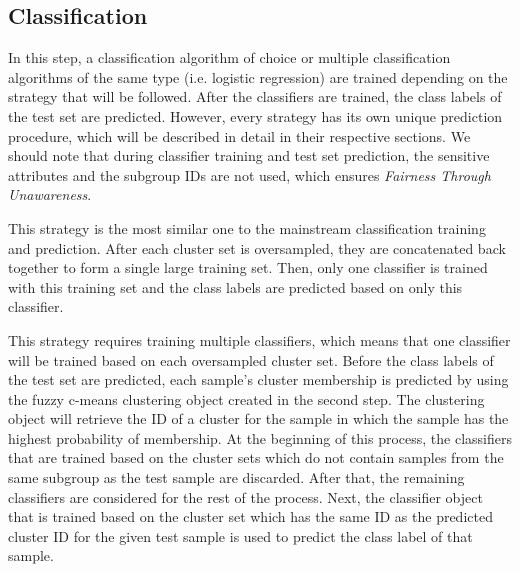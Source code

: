 

\subsection{Classification}\label{ssec:str_classf}

In this step, a classification algorithm of choice or multiple classification algorithms of the same type (i.e. logistic regression) are trained depending on the strategy that will be followed. After the classifiers are trained, the class labels of the test set are predicted. However, every strategy has its own unique prediction procedure, which will be described in detail in their respective sections. We should note that during classifier training and test set prediction, the sensitive attributes and the subgroup IDs are not used, which ensures \textit{Fairness Through Unawareness}.

 This strategy is the most similar one to the mainstream classification training and prediction. After each cluster set is oversampled, they are concatenated back together to form a single large training set. Then, only one classifier is trained with this training set and the class labels are predicted based on only this classifier.

 This strategy requires training multiple classifiers, which means that one classifier will be trained based on each oversampled cluster set. Before the class labels of the test set are predicted, each sample's cluster membership is predicted by using the fuzzy c-means clustering object created in the second step. The clustering object will retrieve the ID of a cluster for the sample in which the sample has the highest probability of membership. At the beginning of this process, the classifiers that are trained based on the cluster sets which do not contain samples from the same subgroup as the test sample are discarded. After that, the remaining classifiers are considered for the rest of the process. Next, the classifier object that is trained based on the cluster set which has the same ID as the predicted cluster ID for the given test sample is used to predict the class label of that sample.

